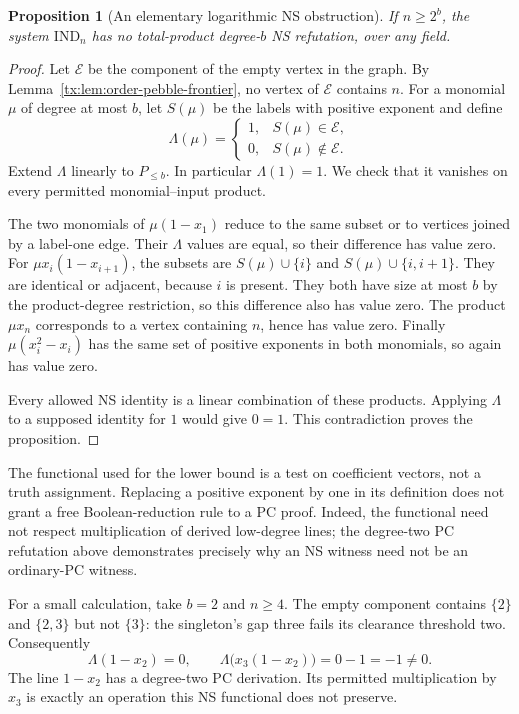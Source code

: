 \documentclass[11pt,a4paper,oneside,openany]{book}
\newtheorem{proposition}[theorem]{Proposition}
\theoremstyle{definition}\newtheorem{definition}[theorem]{Definition}
\theoremstyle{remark}\newtheorem{remark}[theorem]{Remark}
\numberwithin{equation}{chapter}
\begin{document}
\begin{proposition}[An elementary logarithmic NS obstruction]
\label{tx:prop:order-induction-lower}
If $n\ge2^b$, the system $\mathrm{IND}_n$ has no total-product
degree-$b$ NS refutation, over any field.
\end{proposition}
\begin{proof}
Let $\mathcal E$ be the component of the empty vertex in the graph.
By Lemma~\ref{tx:lem:order-pebble-frontier}, no vertex of $\mathcal E$
contains $n$. For a monomial $\mu$ of degree at most $b$, let $S(\mu)$
be the labels with positive exponent and define
\[
 \Lambda(\mu)=
 \begin{cases}1,&S(\mu)\in\mathcal E,\\0,&S(\mu)\notin\mathcal E.
 \end{cases}
\]
Extend $\Lambda$ linearly to $P_{\le b}$. In particular $\Lambda(1)=1$.
We check that it vanishes on every permitted monomial--input product.

The two monomials of $\mu(1-x_1)$ reduce to the same subset or to
vertices joined by a label-one edge. Their $\Lambda$ values are equal,
so their difference has value zero. For
$\mu x_i(1-x_{i+1})$, the subsets are
$S(\mu)\cup\{i\}$ and $S(\mu)\cup\{i,i+1\}$. They are identical
or adjacent, because $i$ is present. They both have size at most $b$
by the product-degree restriction, so this difference also has value
zero. The product $\mu x_n$ corresponds to a vertex containing $n$,
hence has value zero. Finally $\mu(x_i^2-x_i)$ has the same set of
positive exponents in both monomials, so again has value zero.

Every allowed NS identity is a linear combination of these products.
Applying $\Lambda$ to a supposed identity for $1$ would give $0=1$.
This contradiction proves the proposition.
\end{proof}

The functional used for the lower bound is a test on coefficient vectors, not a truth
assignment. Replacing a positive exponent by one in its definition
does not grant a free Boolean-reduction rule to a PC proof.
Indeed, the functional need not respect multiplication of derived
low-degree lines; the degree-two PC refutation above demonstrates
precisely why an NS witness need not be an ordinary-PC witness.

For a small calculation, take $b=2$ and $n\ge4$. The empty component
contains $\{2\}$ and $\{2,3\}$ but not $\{3\}$: the singleton's gap
three fails its clearance threshold two. Consequently
\[
 \Lambda(1-x_2)=0,\qquad
 \Lambda\bigl(x_3(1-x_2)\bigr)=0-1=-1\ne0.
\]
The line $1-x_2$ has a degree-two PC derivation. Its permitted
multiplication by $x_3$ is exactly an operation this NS functional does
not preserve.
\end{document}
